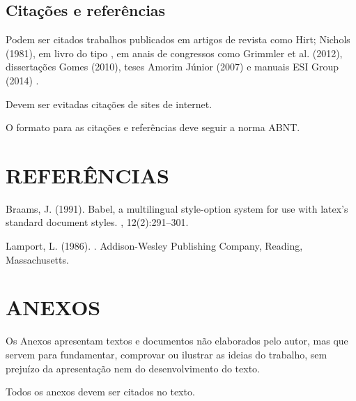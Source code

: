 \documentclass[a4paper,12pt,oneside]{article}
\numberwithin{equation}{section}
\begin{document}
	
\subsection{Citações e referências}

Podem ser citados trabalhos publicados em artigos de revista como Hirt; Nichols (1981), em livro do tipo \cite{Lamport:LaTeX}, em anais de congressos como Grimmler et al. (2012), dissertações Gomes (2010), teses Amorim Júnior (2007) e manuais ESI Group (2014) .

Devem ser evitadas citações de sites de internet.

O formato para as citações e referências deve seguir a norma ABNT.



\section{REFERÊNCIAS}
\begin{thebibliography}{1}

Braams, J. (1991).
\newblock Babel, a multilingual style-option system for use with latex's
  standard document styles.
, 12(2):291--301.

Lamport, L. (1986).
.
\newblock Addison-Wesley Publishing Company, Reading, Massachusetts.

\end{thebibliography}



\section{ANEXOS}

Os Anexos apresentam textos e documentos não elaborados pelo autor, mas que servem para fundamentar, comprovar ou ilustrar as ideias do trabalho, sem prejuízo da apresentação nem do desenvolvimento do texto.

Todos os anexos devem ser citados no texto.
\end{document}
